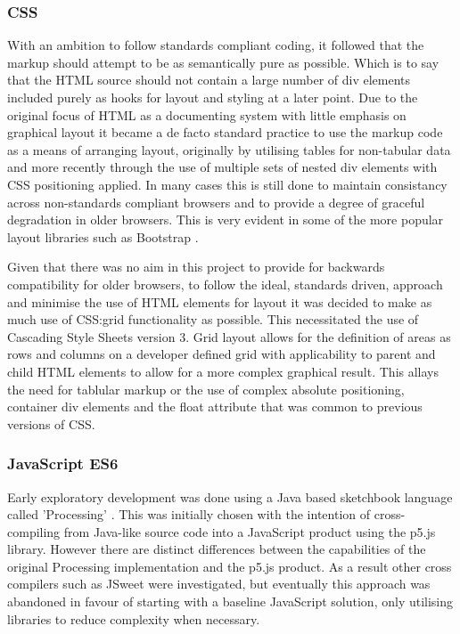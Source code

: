 \documentclass[twoside]{bhamthesis}
\begin{document}
\subsubsection{CSS}
With an ambition to follow standards compliant coding, it followed that the markup should attempt to be as semantically pure as possible. Which is to say that the HTML source should not contain a large number of div elements included purely as hooks for layout and styling at a later point. Due to the original focus of HTML as a documenting system with little emphasis on graphical layout it became a de facto standard practice to use the markup code as a means of arranging layout, originally by utilising tables for non-tabular data and more recently through the use of multiple sets of nested div elements with CSS positioning applied. In many cases this is still done to maintain consistancy across non-standards compliant browsers and to provide a degree of graceful degradation in older browsers. This is very evident in some of the more popular layout libraries such as Bootstrap \cite {otto_get_????}.

Given that there was no aim in this project to provide for backwards compatibility for older browsers, to follow the ideal, standards driven, approach and minimise the use of HTML elements for layout it was decided to make as much use of CSS:grid functionality as possible. This necessitated the use of Cascading Style Sheets version 3. Grid layout allows for the definition of areas as rows and columns on a developer defined grid with applicability to parent and child HTML elements to allow for a more complex graphical result. This allays the need for tablular markup or the use of complex absolute positioning, container div elements and the float attribute that was common to previous versions of CSS.

\subsubsection{JavaScript ES6}
Early exploratory development was done using a Java based sketchbook language called 'Processing' \cite{fry_processing.org_????}. This was initially chosen with the intention of cross-compiling from Java-like source code into a JavaScript product using the p5.js library. However there are distinct differences between the capabilities of the original Processing implementation and the p5.js product. As a result other cross compilers such as JSweet \cite{pawlak_jsweet:_????} were investigated, but eventually this approach was abandoned in favour of starting with a baseline JavaScript solution, only utilising libraries to reduce complexity when necessary.
\end{document}
